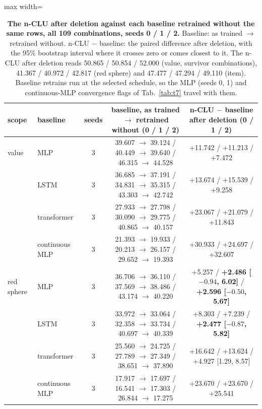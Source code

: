 \documentclass{article} %
\begin{document}
\begin{table}[h]
\centering\scriptsize
\caption{\textbf{The n-CLU after deletion against each baseline retrained without the same rows, all %
109 combinations, seeds 0 / 1 / 2.} Baseline: as trained $\to$ retrained without. n-CLU $-$ baseline: the %
paired difference after deletion, with the 95\% bootstrap interval where it crosses zero or comes
closest to it. The n-CLU after deletion reads 50.865 / 50.854 / 52.000 (value, survivor combinations), %
41.367 / 40.972 / 42.817 (red sphere) and 47.477 / 47.294 / 49.110 (item). Baseline retrains run at the %
selected schedule, so the MLP (seeds 0, 1) and continuous-MLP convergence flags of Tab.~\ref{tab:t7} travel with them.}
\label{tab:rivals-del-seeds}
\setlength{\tabcolsep}{2.4pt}
\begin{adjustbox}{max width=\linewidth}\begin{tabular}{llccc}
\toprule
scope & baseline & seeds & baseline, as trained $\to$ retrained without (0 / 1 / 2) & n-CLU $-$ baseline after deletion (0 / 1 / 2) \\
\midrule
value & MLP & 3 & 39.607 $\to$ 39.124 / 40.449 $\to$ 39.640 / 46.315 $\to$ 44.528 & +11.742 / +11.213 / +7.472 \\
 & LSTM & 3 & 36.685 $\to$ 37.191 / 34.831 $\to$ 35.315 / 43.303 $\to$ 42.742 & +13.674 / +15.539 / +9.258 \\
 & transformer & 3 & 27.933 $\to$ 27.798 / 30.090 $\to$ 29.775 / 40.865 $\to$ 40.157 & +23.067 / +21.079 / +11.843 \\
 & continuous MLP & 3 & 21.393 $\to$ 19.933 / 20.213 $\to$ 26.157 / 29.652 $\to$ 19.393 & +30.933 / +24.697 / +32.607 \\
red sphere & MLP & 3 & 36.706 $\to$ 36.110 / 37.569 $\to$ 38.486 / 43.174 $\to$ 40.220 & +5.257 / \textbf{+2.486 [$-0.94$, 6.02]} / \textbf{+2.596 [$-0.50$, 5.67]} \\
 & LSTM & 3 & 33.972 $\to$ 33.064 / 32.358 $\to$ 33.734 / 40.697 $\to$ 40.339 & +8.303 / +7.239 / \textbf{+2.477 [$-0.87$, 5.82]} \\
 & transformer & 3 & 25.560 $\to$ 24.725 / 27.789 $\to$ 27.349 / 38.651 $\to$ 37.890 & +16.642 / +13.624 / +4.927 [1.29, 8.57] \\
 & continuous MLP & 3 & 17.917 $\to$ 17.697 / 16.541 $\to$ 17.303 / 26.844 $\to$ 17.275 & +23.670 / +23.670 / +25.541 \\

\end{tabular}
\end{adjustbox}
\end{table}
\end{document}
